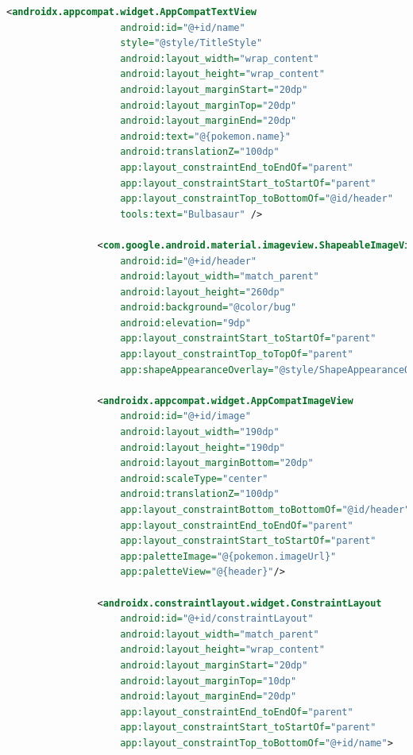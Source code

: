 \documentclass[a4paper, 12pt]{article}
\begin{document}
\begin{lstlisting}[caption={Pokemon Detail Layout.}, label={layout:pk_detail}, language=XML]
                <androidx.appcompat.widget.AppCompatTextView
                    android:id="@+id/name"
                    style="@style/TitleStyle"
                    android:layout_width="wrap_content"
                    android:layout_height="wrap_content"
                    android:layout_marginStart="20dp"
                    android:layout_marginTop="20dp"
                    android:layout_marginEnd="20dp"
                    android:text="@{pokemon.name}"
                    android:translationZ="100dp"
                    app:layout_constraintEnd_toEndOf="parent"
                    app:layout_constraintStart_toStartOf="parent"
                    app:layout_constraintTop_toBottomOf="@id/header"
                    tools:text="Bulbasaur" />
    
                <com.google.android.material.imageview.ShapeableImageView
                    android:id="@+id/header"
                    android:layout_width="match_parent"
                    android:layout_height="260dp"
                    android:background="@color/bug"
                    android:elevation="9dp"
                    app:layout_constraintStart_toStartOf="parent"
                    app:layout_constraintTop_toTopOf="parent"
                    app:shapeAppearanceOverlay="@style/ShapeAppearanceOverlay.CardView" />
    
                <androidx.appcompat.widget.AppCompatImageView
                    android:id="@+id/image"
                    android:layout_width="190dp"
                    android:layout_height="190dp"
                    android:layout_marginBottom="20dp"
                    android:scaleType="center"
                    android:translationZ="100dp"
                    app:layout_constraintBottom_toBottomOf="@id/header"
                    app:layout_constraintEnd_toEndOf="parent"
                    app:layout_constraintStart_toStartOf="parent"
                    app:paletteImage="@{pokemon.imageUrl}"
                    app:paletteView="@{header}"/>
    
                <androidx.constraintlayout.widget.ConstraintLayout
                    android:id="@+id/constraintLayout"
                    android:layout_width="match_parent"
                    android:layout_height="wrap_content"
                    android:layout_marginStart="20dp"
                    android:layout_marginTop="10dp"
                    android:layout_marginEnd="20dp"
                    app:layout_constraintEnd_toEndOf="parent"
                    app:layout_constraintStart_toStartOf="parent"
                    app:layout_constraintTop_toBottomOf="@+id/name">
    

\end{lstlisting}
\end{document}
